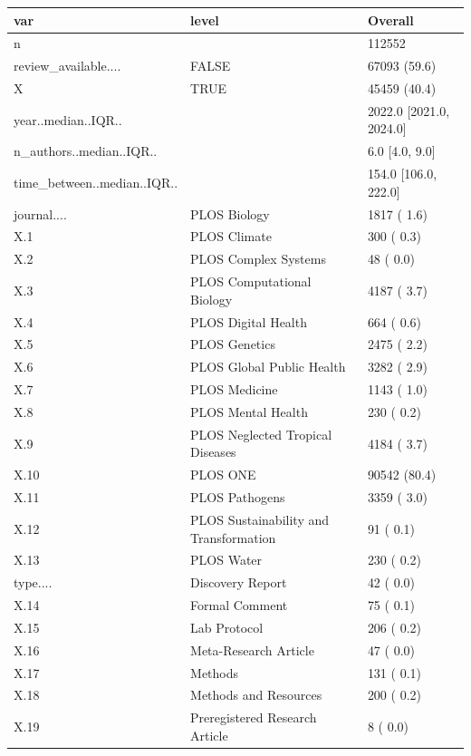 \begin{table}[ht]
\centering
\begin{tabular}{lll}
 var & level & Overall \\ 
  \hline
n &  & 112552 \\ 
  review\_available.... & FALSE &  67093 (59.6)  \\ 
  X & TRUE &  45459 (40.4)  \\ 
  year..median..IQR.. &  & 2022.0 [2021.0, 2024.0] \\ 
  n\_authors..median..IQR.. &  &    6.0 [4.0, 9.0] \\ 
  time\_between..median..IQR.. &  &  154.0 [106.0, 222.0] \\ 
  journal.... & PLOS Biology &   1817 ( 1.6)  \\ 
  X.1 & PLOS Climate &    300 ( 0.3)  \\ 
  X.2 & PLOS Complex Systems &     48 ( 0.0)  \\ 
  X.3 & PLOS Computational Biology &   4187 ( 3.7)  \\ 
  X.4 & PLOS Digital Health &    664 ( 0.6)  \\ 
  X.5 & PLOS Genetics &   2475 ( 2.2)  \\ 
  X.6 & PLOS Global Public Health &   3282 ( 2.9)  \\ 
  X.7 & PLOS Medicine &   1143 ( 1.0)  \\ 
  X.8 & PLOS Mental Health &    230 ( 0.2)  \\ 
  X.9 & PLOS Neglected Tropical Diseases &   4184 ( 3.7)  \\ 
  X.10 & PLOS ONE &  90542 (80.4)  \\ 
  X.11 & PLOS Pathogens &   3359 ( 3.0)  \\ 
  X.12 & PLOS Sustainability and Transformation &     91 ( 0.1)  \\ 
  X.13 & PLOS Water &    230 ( 0.2)  \\ 
  type.... & Discovery Report &     42 ( 0.0)  \\ 
  X.14 & Formal Comment &     75 ( 0.1)  \\ 
  X.15 & Lab Protocol &    206 ( 0.2)  \\ 
  X.16 & Meta-Research Article &     47 ( 0.0)  \\ 
  X.17 & Methods &    131 ( 0.1)  \\ 
  X.18 & Methods and Resources &    200 ( 0.2)  \\ 
  X.19 & Preregistered Research Article &      8 ( 0.0)  \\ 

\end{tabular}
\end{table}
